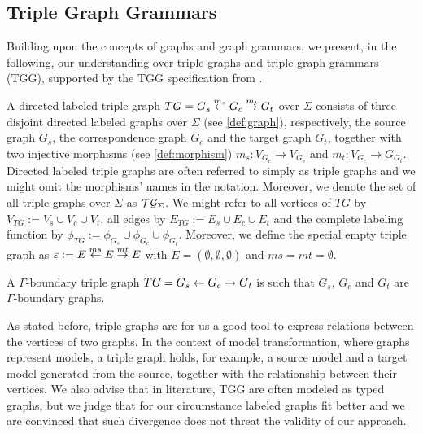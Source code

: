 \documentclass[]{report}
\begin{document}
\subsection{Triple Graph Grammars}
Building upon the concepts of graphs and graph grammars, we present, in the following, our understanding over triple graphs and triple graph grammars (TGG), supported by the TGG specification from \cite{schurr1994specification}.


\begin{definition}
	A directed labeled triple graph $TG = G_s \overset{m_s}{\leftarrow} G_c \overset{m_t}{\rightarrow} G_t$ over $\Sigma$ consists of three disjoint directed labeled graphs over $\Sigma$ (see \ref{def:graph}), respectively, the source graph $G_s$, the correspondence graph $G_c$ and the target graph $G_t$, together with two injective morphisms (see \ref{def:morphism}) $m_s: V_{G_c} \to V_{G_s}$ and $m_t : V_{G_c} \to G_{G_t}$. Directed labeled triple graphs are often referred to simply as triple graphs and we might omit the morphisms' names in the notation. Moreover, we denote the set of all triple graphs over $\Sigma$ as $\mathcal{TG}_{\Sigma}$. We might refer to all vertices of $TG$ by $V_{TG}:= V_s \cup V_c \cup V_t$, all edges by $E_{TG}:= E_s \cup E_c \cup E_t$ and the complete labeling function by $\phi_{TG}:= \phi_{G_s} \cup \phi_{G_c} \cup \phi_{G_t}$.
	Moreover, we define the special empty triple graph as $\varepsilon := E \overset{ms}{\leftarrow} E \overset{mt}{\rightarrow} E$ with $E = (\emptyset, \emptyset, \emptyset)$ and $ms = mt = \emptyset$.
\end{definition}

\begin{definition}
	A $\Gamma\text{-boundary}$ triple graph $TG = G_s \overset{}{\leftarrow} G_c \overset{}{\rightarrow} G_t$ is such that $G_s$, $G_c$ and $G_t$ are $\Gamma\text{-boundary}$ graphs.
\end{definition}

As stated before, triple graphs are for us a good tool to express relations between the vertices of two graphs. In the context of model transformation, where graphs represent models, a triple graph holds, for example, a source model and a target model generated from the source, together with the relationship between their vertices. We also advise that in literature, TGG are often modeled as typed graphs, but we judge that for our circumstance labeled graphs fit better and we are convinced that such divergence does not threat the validity of our approach.
\end{document}
